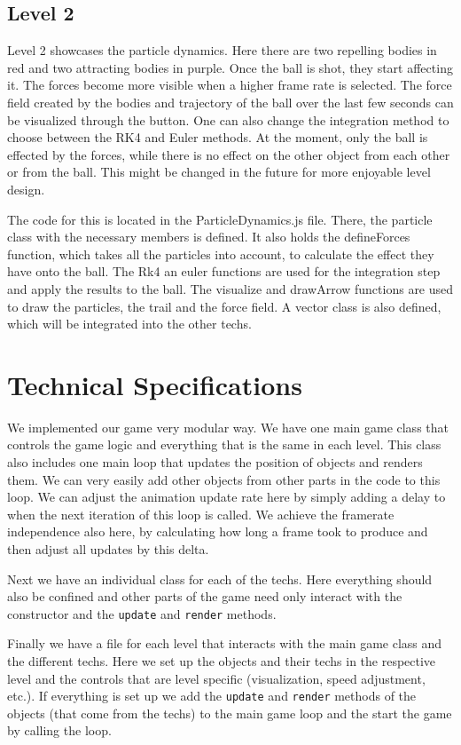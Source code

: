 \documentclass{article}
\begin{document}
\subsection{Level 2}
Level 2 showcases the particle dynamics. Here there are two repelling bodies in red and two attracting bodies in purple. Once the ball is shot, they start affecting it. The forces become more visible when a higher frame rate is selected. The force field created by the bodies and trajectory of the ball over the last few seconds can be visualized through the button. One can also change the integration method to choose between the RK4 and Euler methods. At the moment, only the ball is effected by the forces, while there is no effect on the other object from each other or from the ball. This might be changed in the future for more enjoyable level design. \newline

The code for this is located in the ParticleDynamics.js file. There, the particle class with the necessary members is defined. It also holds the defineForces function, which takes all the particles into account, to calculate the effect they have onto the ball. The Rk4 an euler functions are used for the integration step and apply the results to the ball. The visualize and drawArrow functions are used to draw the particles, the trail and the force field. A vector class is also defined, which will be integrated into the other techs. 
\section{Technical Specifications}

We implemented our game very modular way. We have one main game class that controls the game logic 
and everything that is the same in each level. This class also includes one main loop that 
updates the position of objects and renders them. We can very easily add other objects from other parts in the 
code to this loop. We can adjust the animation update rate here 
by simply adding a delay to when the next iteration of this loop is called. 
We achieve the framerate independence also here, by calculating how long a frame took to produce 
and then adjust all updates by this delta. 

Next we have an individual class for each of the techs. Here everything should 
also be confined and other parts of the game need only interact with the constructor
and the \texttt{update} and \texttt{render} methods.

Finally we have a file for each level that interacts with the main game 
class and the different techs. Here we set up
the objects and their techs in the respective level and the controls that are level specific (visualization, speed adjustment, etc.).
If everything is set up we add the \texttt{update} and \texttt{render} methods of the objects (that come from the techs) 
to the main game loop and the start the game by calling the loop.
\end{document}
